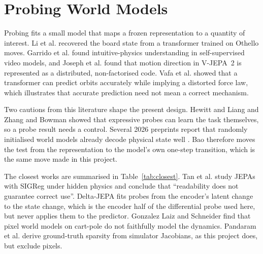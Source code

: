 \documentclass[11pt, a4paper, oneside,enumerate,textcomp]{report}
\begin{document}
\section{Probing World Models}

Probing fits a small model that maps a frozen representation to a quantity of interest. Li et al. \cite{li2023othello} recovered the board state from a transformer trained on Othello moves. Garrido et al. \cite{garrido2025intuitive} found intuitive-physics understanding in self-supervised video models, and Joseph et al. \cite{joseph2026interpreting} found that motion direction in V-JEPA~2 is represented as a distributed, non-factorised code. Vafa et al. \cite{vafa2025foundation} showed that a transformer can predict orbits accurately while implying a distorted force law, which illustrates that accurate prediction need not mean a correct mechanism.

Two cautions from this literature shape the present design. Hewitt and Liang \cite{hewitt2019control} and Zhang and Bowman \cite{zhang2018language} showed that expressive probes can learn the task themselves, so a probe result needs a control. Several 2026 preprints report that randomly initialised world models already decode physical state well \cite{tan2026latent,bao2026correcting}. Bao \cite{bao2026correcting} therefore moves the test from the representation to the model's own one-step transition, which is the same move made in this project.

The closest works are summarised in Table~\ref{tab:closest}. Tan et al. \cite{tan2026latent} study JEPAs with SIGReg under hidden physics and conclude that ``readability does not guarantee correct use''. Delta-JEPA \cite{zhang2026deltajepa} fits probes from the encoder's latent change to the state change, which is the encoder half of the differential probe used here, but never applies them to the predictor. Gonzalez Laiz and Schneider \cite{gonzalez2026limits} find that pixel world models on cart-pole do not faithfully model the dynamics. Pandaram et al. \cite{pandaram2025sparsity} derive ground-truth sparsity from simulator Jacobians, as this project does, but exclude pixels.
\end{document}
